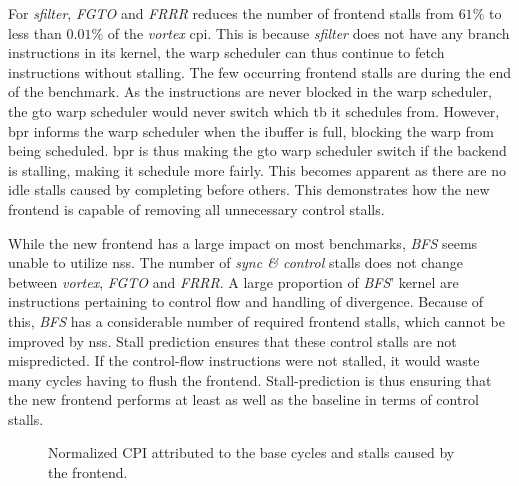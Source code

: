 For \textit{sfilter}, \textit{FGTO} and \textit{FRRR} reduces the number of frontend stalls from $61\%$ to less than $0.01\%$ of the \textit{\Gls{vortex}} \acrshort{cpi}. This is because \textit{sfilter} does not have any branch instructions in its kernel, the warp scheduler can thus continue to fetch instructions without stalling. The few occurring frontend stalls are during the end of the benchmark. As the instructions are never blocked in the warp scheduler, the \acrshort{gto} warp scheduler would never switch which \acrshort{tb} it schedules from. However, \acrshort{bpr} informs the warp scheduler when the ibuffer is full, blocking the warp from being scheduled. \acrshort{bpr} is thus making the \acrshort{gto} warp scheduler switch if the backend is stalling, making it schedule more fairly. This becomes apparent as there are no idle stalls caused by  completing before others. This demonstrates how the new frontend is capable of removing all unnecessary control stalls.

While the new frontend has a large impact on most benchmarks, \textit{BFS} seems unable to utilize \acrshort{nss}. The number of \textit{sync \& control} stalls does not change between \textit{\Gls{vortex}}, \textit{FGTO} and \textit{FRRR}. A large proportion of \textit{BFS}' kernel are instructions pertaining to control flow and handling of divergence. Because of this, \textit{BFS} has a considerable number of required frontend stalls, which cannot be improved by \acrshort{nss}. Stall prediction ensures that these control stalls are not mispredicted. If the control-flow instructions were not stalled, it would waste many cycles having to flush the frontend. Stall-prediction is thus ensuring that the new frontend performs at least as well as the baseline in terms of control stalls. 

\begin{figure}
    \centering
    \caption[Normalized \acrshort{cpi} attributed to the frontend]{Normalized CPI attributed to the base cycles and stalls caused by the frontend.}
    \label{fig:norm_cpi_frontend}
\end{figure}

